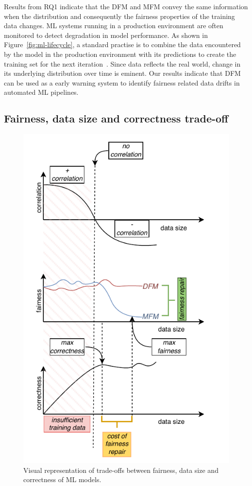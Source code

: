 \documentclass[sigconf,review,anonymous]{acmart}
\begin{document}
Results from RQ1 indicate that the DFM and MFM convey the same
information when the distribution and consequently the fairness
properties of the training data changes. ML systems running in a
production environment are often monitored to detect degradation in
model performance. As shown in Figure \ref{fig:ml-lifecycle}, a
standard practise is to combine the data encountered by the model in
the production environment with its predictions to create the training
set for the next iteration \cite{biessmann2021automated}. Since data
reflects the real world, change in its underlying distribution over
time is eminent. Our results indicate that DFM can be used as a early
warning system to identify fairness related data drifts in automated
ML pipelines.

\subsection{Fairness, data size and correctness trade-off}\label{sec:discuss-fair-eff-perf-trade}

\begin{figure}
  \centering
  \includegraphics[width=\linewidth]{tradeoff.pdf}
  \caption{Visual representation of trade-offs between fairness, data
    size and correctness of ML models.}
  \label{fig:tradeoff}
\end{figure}
\end{document}
